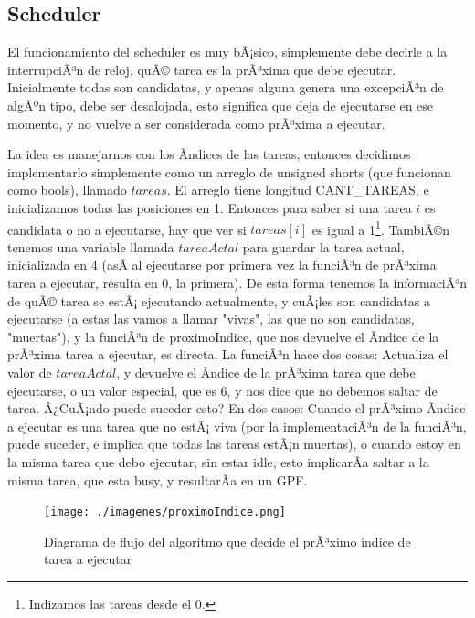 \documentclass[10pt, a4paper]{article}
\begin{document}
\subsection{Scheduler}
El funcionamiento del scheduler es muy bÃ¡sico, simplemente debe decirle a la interrupciÃ³n de reloj, quÃ© tarea es la prÃ³xima que debe ejecutar. Inicialmente todas son candidatas, y apenas alguna genera una excepciÃ³n de algÃºn tipo, debe ser desalojada, esto significa que deja de ejecutarse en ese momento, y no vuelve a ser considerada como prÃ³xima a ejecutar.

La idea es manejarnos con los Ã­ndices de las tareas, entonces decidimos implementarlo simplemente como un arreglo de unsigned shorts (que funcionan como bools), llamado $tareas$. El arreglo tiene longitud CANT\_TAREAS, e inicializamos todas las posiciones en 1. Entonces para saber si una tarea $i$ es candidata o no a ejecutarse, hay que ver si $tareas[i]$ es igual a 1\footnote{Indizamos las tareas desde el 0.}. TambiÃ©n tenemos una variable llamada $tareaActal$ para guardar la tarea actual, inicializada en 4 (asÃ­ al ejecutarse por primera vez la funciÃ³n de prÃ³xima tarea a ejecutar, resulta en 0, la primera). De esta forma tenemos la informaciÃ³n de quÃ© tarea se estÃ¡ ejecutando actualmente, y cuÃ¡les son candidatas a ejecutarse (a estas las vamos a llamar "vivas", las que no son candidatas, "muertas"), y la funciÃ³n de proximoIndice, que nos devuelve el Ã­ndice de la prÃ³xima tarea a ejecutar, es directa. La funciÃ³n hace dos cosas: Actualiza el valor de $tareaActal$, y devuelve el Ã­ndice de la prÃ³xima tarea que debe ejecutarse, o un valor especial, que es 6, y nos dice que no debemos saltar de tarea. Â¿CuÃ¡ndo puede suceder esto? En dos casos: Cuando el prÃ³ximo Ã­ndice a ejecutar es una tarea que no estÃ¡ viva (por la implementaciÃ³n de la funciÃ³n, puede suceder, e implica que todas las tareas estÃ¡n muertas), o cuando estoy en la misma tarea que debo ejecutar, sin estar idle, esto implicarÃ­a saltar a la misma tarea, que esta busy, y resultarÃ­a en un GPF.

	\begin{figure}[H]
  		\centering
		\texttt{[image: ./imagenes/proximoIndice.png]}
		\caption{Diagrama de flujo del algoritmo que decide el prÃ³ximo indice de tarea a ejecutar}
		\label{fig:proximoIndice}
	\end{figure}
	
\end{document}
